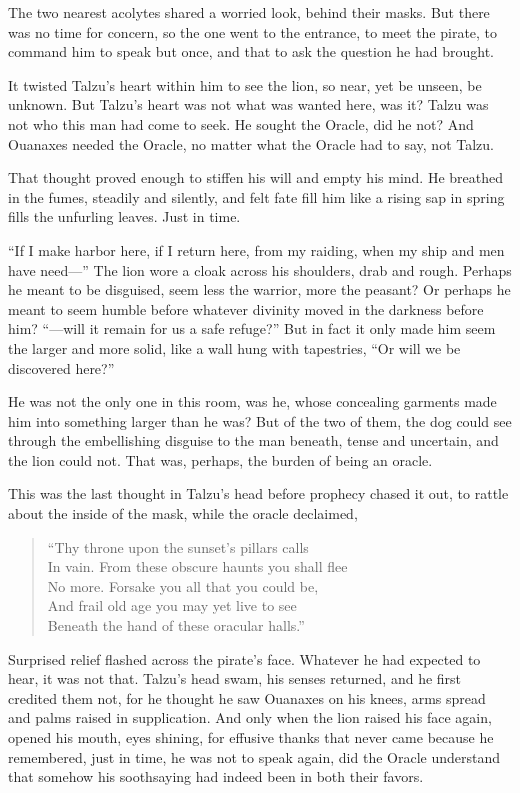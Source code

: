 The two nearest acolytes shared a worried look, behind their masks. But there was no time for concern, so the one went to the entrance, to meet the pirate, to command him to speak but once, and that to ask the question he had brought.

It twisted Talzu's heart within him to see the lion, so near, yet be unseen, be unknown. But Talzu's heart was not what was wanted here, was it? Talzu was not who this man had come to seek. He sought the Oracle, did he not? And Ouanaxes needed the Oracle, no matter what the Oracle had to say, not Talzu.

That thought proved enough to stiffen his will and empty his mind. He breathed in the fumes, steadily and silently, and felt fate fill him like a rising sap in spring fills the unfurling leaves. Just in time.

``If I make harbor here, if I return here, from my raiding, when my ship and men have need---'' The lion wore a cloak across his shoulders, drab and rough. Perhaps he meant to be disguised, seem less the warrior, more the peasant? Or perhaps he meant to seem humble before whatever divinity moved in the darkness before him? ``---will it remain for us a safe refuge?'' But in fact it only made him seem the larger and more solid, like a wall hung with tapestries, ``Or will we be discovered here?''

He was not the only one in this room, was he, whose concealing garments made him into something larger than he was? But of the two of them, the dog could see through the embellishing disguise to the man beneath, tense and uncertain, and the lion could not. That was, perhaps, the burden of being an oracle.

This was the last thought in Talzu's head before prophecy chased it out, to rattle about the inside of the mask, while the oracle declaimed,

\begin{verse}
``Thy throne upon the sunset's pillars calls \\
In vain. From these obscure haunts you shall flee \\
No more. Forsake you all that you could be, \\
And frail old age you may yet live to see \\
Beneath the hand of these oracular halls.''
\end{verse}

Surprised relief flashed across the pirate's face. Whatever he had expected to hear, it was not that. Talzu's head swam, his senses returned, and he first credited them not, for he thought he saw Ouanaxes on his knees, arms spread and palms raised in supplication. And only when the lion raised his face again, opened his mouth, eyes shining, for effusive thanks that never came because he remembered, just in time, he was not to speak again, did the Oracle understand that somehow his soothsaying had indeed been in both their favors.

